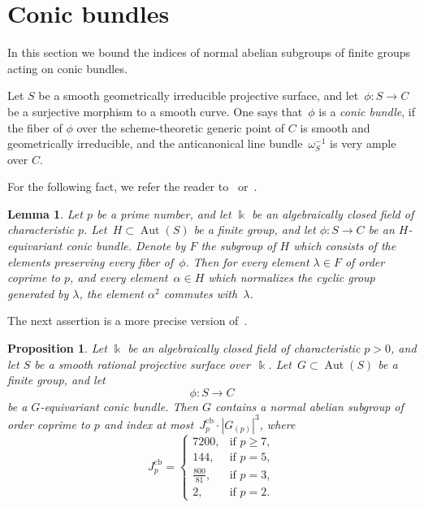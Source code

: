 \documentclass[12pt]{amsart}
\numberwithin{equation}{section}
\newtheorem{lemma}[subsection]{Lemma}
\newtheorem{proposition}[subsection]{Proposition}
\theoremstyle{definition}
\DeclareMathOperator{\Aut}{Aut}
\def \ge {\geqslant}
\begin{document}
\section{Conic bundles}
\label{section:CB}

In this section we bound the indices of normal abelian subgroups of finite
groups acting on conic bundles.

Let $S$ be a smooth geometrically irreducible projective surface,
and let~\mbox{$\phi\colon S\to C$}
be a surjective morphism to a smooth curve.
One says that~$\phi$ is a \emph{conic bundle},
if the fiber of $\phi$
over the scheme-theoretic generic point of $C$ is  smooth
and geometrically  irreducible, and the anticanonical line
bundle~$\omega^{-1}_S$ is very ample over $C$.

For the following fact, we refer the reader to~\mbox{\cite[Lemma~5.2]{Serre-2009}}
or~\mbox{\cite[Lemma~9.1]{ChenShramov}}.

\begin{lemma}\label{lemma:Serre}
Let $p$ be a prime number, and let
$\Bbbk$ be an algebraically closed field of characteristic $p$.
Let~\mbox{$H\subset\Aut(S)$} be a finite group,
and let $\phi\colon S\to C$
be an $H$-equivariant conic bundle.
Denote by $F$ the subgroup of $H$ which consists of the elements preserving every fiber of~$\phi$. Then for every element
$\lambda\in F$ of order coprime to $p$, and every element~\mbox{$\alpha\in H$}
which normalizes the cyclic group generated by $\lambda$, the element $\alpha^2$
commutes with~$\lambda$.
\end{lemma}




The next assertion is a more precise version of~\mbox{\cite[Lemma~9.2]{ChenShramov}}.

\begin{proposition}\label{proposition:CB}
Let $\Bbbk$ be an algebraically closed field of characteristic $p>0$, and let
$S$ be a smooth rational projective surface over~$\Bbbk$.
Let~\mbox{$G\subset\Aut(S)$} be a finite group, and let
$$
\phi\colon S\to C
$$
be a $G$-equivariant conic bundle.
Then $G$ contains a normal abelian subgroup of order coprime
to $p$ and index at most~\mbox{$J_p^{\mathrm{cb}}\cdot |G_{(p)}|^{3}$},
where
\begin{equation}\label{eq:J-CB}
J_p^{\mathrm{cb}}=\begin{cases}
7200, &\text{if\ } p\ge 7,\\
144, &\text{if\ } p=5,\\
\frac{800}{81}, &\text{if\ } p=3,\\
2, &\text{if\ } p=2.
\end{cases}
\end{equation}
\end{proposition}
\end{document}
